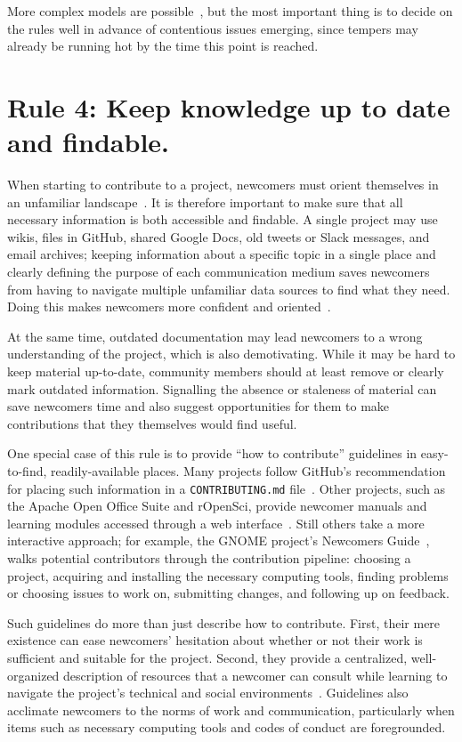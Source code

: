 \documentclass[10pt,letterpaper]{article}
\newcommand{\rulemajor}[1]{\section*{#1}}
\begin{document}
More complex models are possible~\cite{apache-governance},
but the most important thing is to decide on the rules well in advance of contentious issues emerging,
since tempers may already be running hot by the time this point is reached.

\rulemajor{Rule 4: Keep knowledge up to date and findable.}

When starting to contribute to a project,
newcomers must orient themselves in an unfamiliar landscape~\cite{dagenais2010}.
It is therefore important to make sure that all necessary information is both accessible and findable.
A single project may use wikis, files in GitHub, shared Google Docs, old tweets or Slack messages, and email archives;
keeping information about a specific topic in a single place
and clearly defining the purpose of each communication medium
saves newcomers from having to navigate multiple unfamiliar data sources to find what they need.
Doing this makes newcomers more confident and oriented~\cite{steinmacher2016}.

At the same time,
outdated documentation may lead newcomers to a wrong understanding of the project,
which is also demotivating.
While it may be hard to keep material up-to-date,
community members should at least remove or clearly mark outdated information.
Signalling the absence or staleness of material can save newcomers time
and also suggest opportunities for them to make contributions that they themselves would find useful.

One special case of this rule is to provide ``how to contribute'' guidelines in easy-to-find, readily-available places.
Many projects follow GitHub's recommendation for placing such information in a \texttt{CONTRIBUTING.md} file~\cite{github-rec}.
Other projects,
such as the Apache Open Office Suite and rOpenSci,
provide newcomer manuals and learning modules accessed through a web interface~\cite{apache-guidelines,ropensci-guidelines}.
Still others take a more interactive approach;
for example,
the GNOME project's Newcomers Guide~\cite{gnome-newcomers}, walks potential contributors through the contribution pipeline:
choosing a project,
acquiring and installing the necessary computing tools,
finding problems or choosing issues to work on,
submitting changes,
and following up on feedback.

Such guidelines do more than just describe how to contribute.
First,
their mere existence can ease newcomers' hesitation
about whether or not their work is sufficient and suitable for the project.
Second,
they provide a centralized, well-organized description of resources
that a newcomer can consult while learning to navigate the project's technical and social environments~\cite{zanatta2017}.
Guidelines also acclimate newcomers to the norms of work and communication,
particularly when items such as necessary computing tools and codes of conduct are foregrounded.
\end{document}

